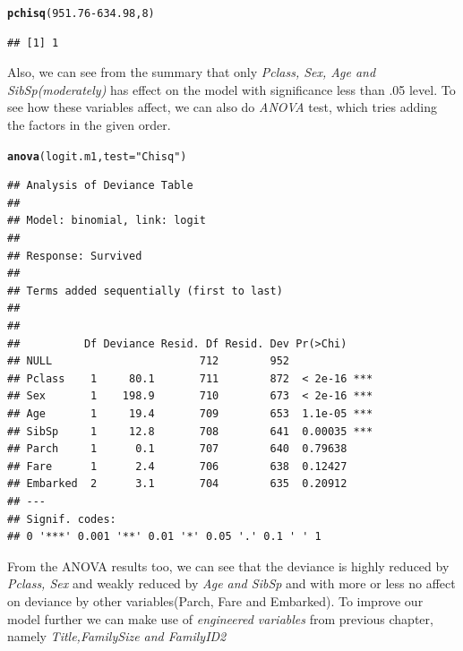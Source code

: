 \documentclass[a4paper,10pt]{report}\usepackage[]{graphicx}\usepackage[]{color}
\makeatletter
\newcommand{\hlnum}[1]{\textcolor[rgb]{0.686,0.059,0.569}{#1}}%
\newcommand{\hlstr}[1]{\textcolor[rgb]{0.192,0.494,0.8}{#1}}%
\newcommand{\hlopt}[1]{\textcolor[rgb]{0,0,0}{#1}}%
\newcommand{\hlstd}[1]{\textcolor[rgb]{0.345,0.345,0.345}{#1}}%
\newcommand{\hlkwc}[1]{\textcolor[rgb]{0.333,0.667,0.333}{#1}}%
\newcommand{\hlkwd}[1]{\textcolor[rgb]{0.737,0.353,0.396}{\textbf{#1}}}%
\newenvironment{kframe}{%
 \def\at@end@of@kframe{}%
 \ifinner\ifhmode%
  \def\at@end@of@kframe{\end{minipage}}%
  \begin{minipage}{\columnwidth}%
 \fi\fi%
 \def\FrameCommand##1{\hskip\@totalleftmargin \hskip-\fboxsep
 \colorbox{shadecolor}{##1}\hskip-\fboxsep
     \hskip-\linewidth \hskip-\@totalleftmargin \hskip\columnwidth}%
 \MakeFramed {\advance\hsize-\width
   \@totalleftmargin\z@ \linewidth\hsize
   \@setminipage}}%
 {\par\unskip\endMakeFramed%
 \at@end@of@kframe}
\newenvironment{knitrout}{}{} %
\makeatother
\begin{document}
\begin{knitrout}
\color{fgcolor}\begin{kframe}
\begin{alltt}
\hlkwd{pchisq}\hlstd{(}\hlnum{951.76}\hlopt{-}\hlnum{634.98}\hlstd{,} \hlnum{8}\hlstd{)}
\end{alltt}
\begin{verbatim}
## [1] 1
\end{verbatim}
\end{kframe}
\end{knitrout}
Also, we can see from the summary that only \emph{Pclass, Sex, Age and SibSp(moderately)} has effect on the model with significance less than .05 level. To see how these variables affect, we can also do \emph{ANOVA} test, which tries adding the factors in the given order.
\begin{knitrout}
\color{fgcolor}\begin{kframe}
\begin{alltt}
\hlkwd{anova}\hlstd{(logit.m1,} \hlkwc{test}\hlstd{=}\hlstr{"Chisq"}\hlstd{)}
\end{alltt}
\begin{verbatim}
## Analysis of Deviance Table
## 
## Model: binomial, link: logit
## 
## Response: Survived
## 
## Terms added sequentially (first to last)
## 
## 
##          Df Deviance Resid. Df Resid. Dev Pr(>Chi)    
## NULL                       712        952             
## Pclass    1     80.1       711        872  < 2e-16 ***
## Sex       1    198.9       710        673  < 2e-16 ***
## Age       1     19.4       709        653  1.1e-05 ***
## SibSp     1     12.8       708        641  0.00035 ***
## Parch     1      0.1       707        640  0.79638    
## Fare      1      2.4       706        638  0.12427    
## Embarked  2      3.1       704        635  0.20912    
## ---
## Signif. codes:  
## 0 '***' 0.001 '**' 0.01 '*' 0.05 '.' 0.1 ' ' 1
\end{verbatim}
\end{kframe}
\end{knitrout}
From the ANOVA results too, we can see that the deviance is highly reduced by \emph{Pclass, Sex} and weakly reduced by \emph{Age and SibSp} and with more or less no affect on deviance by other variables(Parch, Fare and Embarked).
To improve our model further we can make use of \emph{engineered variables} from previous chapter, namely \emph{Title,FamilySize and FamilyID2}
\end{document}
